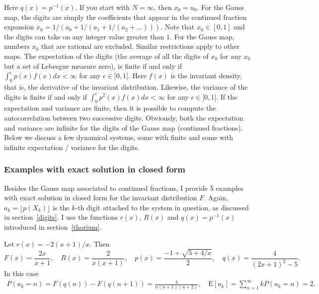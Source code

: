 \documentclass[oneside,10pt]{book}
\begin{document}
Here $q(x)=p^{-1}(x)$. If you start with $N=\infty$, then $x_0=u_0$. For the \textcolor{index}{Gauss map}, the digits are simply the coefficients that appear in the continued fraction expansion $x_0=1/(a_0+1/(a_1+1/(a_2+\dots)))$. Note that $x_0\in[0,1]$ and the digits can take on any integer value greater than $1$. For the Gauss map, numbers $x_0$ that are rational are excluded. Similar restrictions apply to other maps. The expectation of the digits (the average of all the digits of $x_0$ for any $x_0$ but a set of Lebesgue measure zero), is finite if and only if $\int_0^\epsilon p(x)f(x)dx<\infty$ for any $\epsilon\in ]0,1]$. Here $f(x)$ is the invariant density, that is, the derivative of the invariant distribution. Likewise, the variance of the digits is finite if and only if $\int_0^\epsilon p^2(x)f(x)dx<\infty$ for any $\epsilon\in ]0,1]$. If the expectation and variance are finite, then it is possible to compute the autocorrelation between two successive digits. Obviously, both the expectation and variance are infinite for the digits of the Gauss map (continued fractions). Below we discuss a few dynamical systems, some with finite and some with infinite expectation / variance for the digits.

\subsubsection{Examples with exact solution in closed form}\label{cf4366}

Besides the Gauss map associated to continued fractions, I provide 5 examples with exact solution in closed form for the invariant distribution $F$. Again, $a_k=\lfloor p(X_k)\rfloor$ is the $k$-th digit attached to the system in question, as discussed in section~\ref{digits}. I use the functions
 $r(x)$, $R(x)$ and $q(x)=p^{-1}(x)$ introduced in section~\ref{thorium}. \vspace{1ex}


\noindent Let $r(x)=-2(x+1)/x$. Then
$$ F(x)=\frac{2x}{x+1}, \quad R(x)=\frac{2}{x(x+1)},\quad p(x)=\frac{-1+\sqrt{5+4/x}}{2}, \quad q(x)=\frac{4}{(2x+1)^2-5}.$$
In this case
\begin{align}
P(a_k = n)  =F(q(n))-F(q(n+1))=\frac{4}{n(n+1)(n+2)}, \quad
\text{E}[a_k]  =\sum_{n=1}^\infty k P(a_k=n)=2. \nonumber
\end{align}

\end{document}
